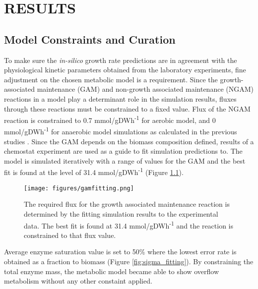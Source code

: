 \chapter{RESULTS}

\section{Model Constraints and Curation}


To make sure the \emph{in-silico} growth rate predictions are in agreement with the physiological kinetic parameters obtained from the laboratory experiments, fine adjustment on the chosen metabolic model is a requirement. Since the growth-associated maintenance (GAM) and non-growth associated maintenance (NGAM) reactions in a model play a determinant role in the simulation results, fluxes through these reactions must be constrained to a fixed value. Flux of the NGAM reaction is constrained to 0.7 mmol/gDWh\textsuperscript{-1} for aerobic model, and 0 mmol/gDWh\textsuperscript{-1} for anaerobic model simulations as calculated in the previous studies \cite{nilsson2016metabolic}. Since the GAM depends on the biomass composition defined, results of a chemostat experiment \cite{van1998effect} are used as a guide to fit simulation predictions to. The model is simulated iteratively with a range of values for the GAM and the best fit is found at the level of 31.4 mmol/gDWh\textsuperscript{-1} (Figure \ref{fig:gam_fitting}).

\begin{figure}[H]
  \begin{center}
  \texttt{[image: figures/gamfitting.png]}
  \caption[The required flux for the growth associated maintenance reaction is determined by the fitting simulation results to the experimental data]{The required flux for the growth associated maintenance reaction is determined by the fitting simulation results to the experimental data. The best fit is found at 31.4 mmol/gDWh\textsuperscript{-1} and the reaction is constrained to that flux value.}
  \end{center}
  \label{fig:gam_fitting}
\end{figure}

Average enzyme saturation value is set to 50\% where the lowest error rate is obtained as a fraction to biomass (Figure \ref{fig:sigma_fitting}). By constraining the total enzyme mass, the metabolic model became able to show overflow metabolism without any other constaint applied.

